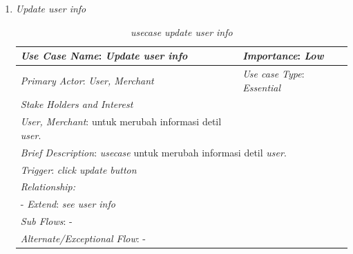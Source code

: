 \documentclass[a4paper]{article}
\begin{document}
\begin{enumerate}
\begin{enumerate}
        \item \textit{Update user info}
        \begin{table}[h]
            \centering
            \begin{tabular}{|lll}
            \hline
            \multicolumn{1}{|l|}{\textit{Use Case Name}: \textit{Update user info}}             & \multicolumn{2}{l|}{\textit{Importance}: \textit{Low}}   \\ \hline
            \multicolumn{1}{|l|}{\textit{Primary Actor}: \textit{User, Merchant}}             & \multicolumn{2}{l|}{\textit{Use case Type}: \textit{Essential}} \\ \hline
            \multicolumn{1}{|l|}{\textit{Stake Holders and Interest}} &                               &                               \\ \cline{1-1}
            \multicolumn{1}{|l|}{\textit{User, Merchant}: untuk merubah informasi detil \textit{user}.}                                                     &                               &                               \\ \hline
            \multicolumn{3}{|l|}{\textit{Brief Description}: \textit{usecase} untuk merubah informasi detil \textit{user}.}                                                                         \\ \hline
            \multicolumn{3}{|l|}{\textit{Trigger}: \textit{click update button}}                                                                                   \\ \hline
            \multicolumn{3}{|l|}{\textit{Relationship:}}                                                                              \\ \hline
            \multicolumn{3}{|l|}{- \textit{Extend}: \textit{see user info}}                                                                                                                     \\ \hline
            \multicolumn{3}{|l|}{\textit{Sub Flows}: -}                                                                                 \\ \hline
            \multicolumn{3}{|l|}{\textit{Alternate/Exceptional Flow}: -}                                                                \\ \hline
            \end{tabular}
            \caption{\textit{usecase update user info} }
        \end{table}


\end{enumerate}
\end{enumerate}
\end{document}
